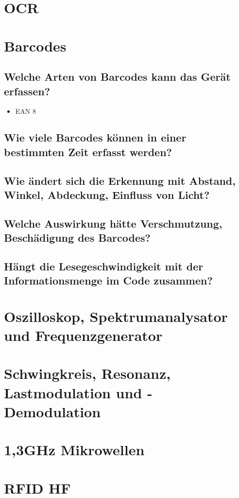 \documentclass[a4paper,12pt]{scrartcl}
\begin{document}
\section{OCR}
\section{Barcodes}
\subsection{Welche Arten von Barcodes kann das Gerät erfassen?}
\begin{itemize}
  \item EAN 8
\end{itemize}
\subsection{Wie viele Barcodes können in einer bestimmten Zeit erfasst werden?}
\subsection{Wie ändert sich die Erkennung mit Abstand, Winkel, Abdeckung, Einfluss von Licht?}
\subsection{Welche Auswirkung hätte Verschmutzung, Beschädigung des Barcodes?}
\subsection{Hängt die Lesegeschwindigkeit mit der Informationsmenge im Code zusammen?}

\section{Oszilloskop, Spektrumanalysator und Frequenzgenerator}

\section{Schwingkreis, Resonanz, Lastmodulation und -Demodulation}

\section{1,3GHz Mikrowellen}

\section{RFID HF}
\end{document}
